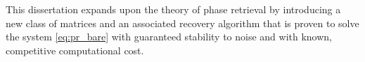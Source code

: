 This dissertation expands upon the theory of phase retrieval by introducing a new class of matrices and an associated recovery algorithm that is proven to solve the system \eqref{eq:pr_bare} with guaranteed stability to noise and with known, competitive computational cost.




